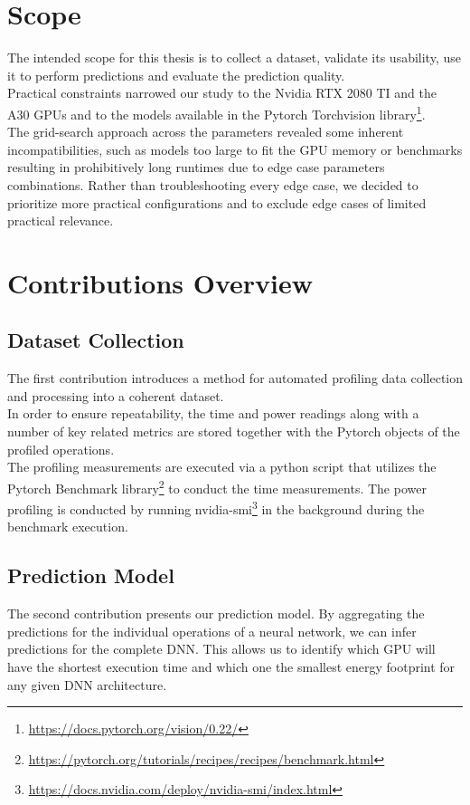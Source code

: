 \section{Scope}

The intended scope for this thesis is to collect a dataset, validate its usability, use it to perform predictions and evaluate the prediction quality. \\
Practical constraints narrowed our study to the Nvidia RTX 2080 TI and the A30 GPUs and to the models available in the Pytorch Torchvision library\footnote{\url{https://docs.pytorch.org/vision/0.22/}}. \\
The grid-search approach across the parameters revealed some inherent incompatibilities, such as models too large to fit the GPU memory or benchmarks resulting in prohibitively long runtimes due to edge case parameters combinations. Rather than troubleshooting every edge case, we decided to prioritize more practical configurations and to exclude edge cases of limited practical relevance.

\section{Contributions Overview}
\subsection{Dataset Collection}

The first contribution introduces a method for automated profiling data collection and processing into a coherent dataset.\\
In order to ensure repeatability, the time and power readings along with a number of key related metrics are stored together with the Pytorch objects of the profiled operations. \\
The profiling measurements are executed via a python script that utilizes the Pytorch Benchmark library\footnote{\url{https://pytorch.org/tutorials/recipes/recipes/benchmark.html}} to conduct the time measurements. The power profiling is conducted by running nvidia-smi\footnote{\url{https://docs.nvidia.com/deploy/nvidia-smi/index.html}} in the background during the benchmark execution. 

\subsection{Prediction Model}
The second contribution presents our prediction model. By aggregating the predictions for the individual operations of a neural network, we can infer predictions for the complete DNN. This allows us to identify which GPU will have the shortest execution time and which one the smallest energy footprint for any given DNN architecture. 

